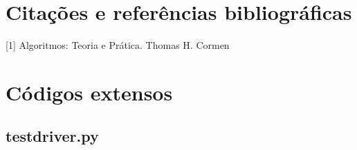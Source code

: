 \documentclass[12pt,a4paper,twoside]{report}
\begin{document}
\chapter{Citações e referências bibliográficas}
[1] Algoritmos: Teoria e Prática. Thomas H. Cormen
		\date{Today}



\clearpage
{}
\appendix

\chapter{Códigos extensos \label{ap:testdriver}}
\section{testdriver.py}

\end{document}
